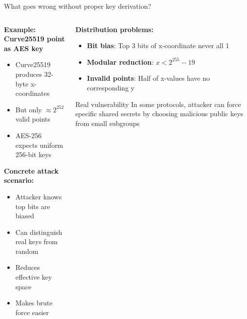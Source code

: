 \documentclass[aspectratio=169, lualatex, handout]{beamer}
\begin{document}
\begin{frame}{What goes wrong without proper key derivation?}
	\begin{columns}[c]
		\begin{column}{0.5\textwidth}
			\textbf{Example: Curve25519 point as AES key}
			\begin{itemize}
				\item Curve25519 produces 32-byte x-coordinates
				\item But only $\approx 2^{252}$ valid points
				\item AES-256 expects uniform 256-bit keys
			\end{itemize}
			\textbf{Concrete attack scenario:}
			\begin{itemize}
				\item Attacker knows top bits are biased
				\item Can distinguish real keys from random
				\item Reduces effective key space
				\item Makes brute force easier
			\end{itemize}
		\end{column}
		\begin{column}{0.5\textwidth}
			\textbf{Distribution problems:}
			\begin{itemize}
				\item \textbf{Bit bias}: Top 3 bits of x-coordinate never all 1
				\item \textbf{Modular reduction}: $x < 2^{255} - 19$
				\item \textbf{Invalid points}: Half of x-values have no corresponding y
			\end{itemize}
			\begin{alertblock}{Real vulnerability}
				In some protocols, attacker can force specific shared secrets by choosing malicious public keys from small subgroups
			\end{alertblock}
		\end{column}
	\end{columns}
\end{frame}
\end{document}

